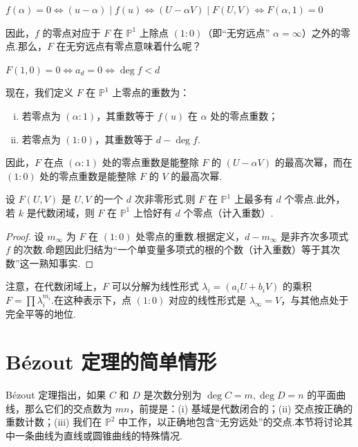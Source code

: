 \(
f(\alpha) = 0 \iff (u - \alpha) \mid f(u) \iff (U - \alpha V) \mid F(U,V) \iff F(\alpha, 1) = 0
\)

因此，\(f\) 的零点对应于 \(F\) 在 \(\mathbb{P}^1\) 上除点 \((1:0)\)（即“无穷远点” \(\alpha = \infty\)）之外的零点.那么，\(F\) 在无穷远点有零点意味着什么呢？

\(
F(1,0) = 0 \iff a_d = 0 \iff \deg f < d
\)

现在，我们定义 \(F\) 在 \(\mathbb{P}^1\) 上零点的重数为：
\begin{enumerate}[(i)]
    \item 若零点为 \((\alpha:1)\)，其重数等于 \(f(u)\) 在 \(\alpha\) 处的零点重数；
    \item 若零点为 \((1:0)\)，其重数等于 \(d - \deg f\).
\end{enumerate}
因此，\(F\) 在点 \((\alpha:1)\) 处的零点重数是能整除 \(F\) 的 \((U - \alpha V)\) 的最高次幂，而在 \((1:0)\) 处的零点重数是能整除 \(F\) 的 \(V\) 的最高次幂.

\begin{proposition}
设 \(F(U,V)\) 是 \(U,V\) 的一个 \(d\) 次非零形式.则 \(F\) 在 \(\mathbb{P}^1\) 上最多有 \(d\) 个零点.此外，若 \(k\) 是代数闭域，则 \(F\) 在 \(\mathbb{P}^1\) 上恰好有 \(d\) 个零点（计入重数）.
\end{proposition}
\begin{proof}
设 \(m_\infty\) 为 \(F\) 在 \((1:0)\) 处零点的重数.根据定义，\(d - m_\infty\) 是非齐次多项式 \(f\) 的次数.命题因此归结为“一个单变量多项式的根的个数（计入重数）等于其次数”这一熟知事实.
\end{proof}

注意，在代数闭域上，\(F\) 可以分解为线性形式 \(\lambda_i = (a_i U + b_i V)\) 的乘积 \(F = \prod \lambda_i^{m_i}\).在这种表示下，点 \((1:0)\) 对应的线性形式是 \(\lambda_\infty = V\)，与其他点处于完全平等的地位.

\section{Bézout 定理的简单情形}

Bézout 定理指出，如果 \(C\) 和 \(D\) 是次数分别为 \(\deg C = m, \deg D = n\) 的平面曲线，那么它们的交点数为 \(mn\)，前提是：(i) 基域是代数闭合的；(ii) 交点按正确的重数计数；(iii) 我们在 \(\mathbb{P}^2\) 中工作，以正确地包含“无穷远处”的交点.本节将讨论其中一条曲线为直线或圆锥曲线的特殊情况.

